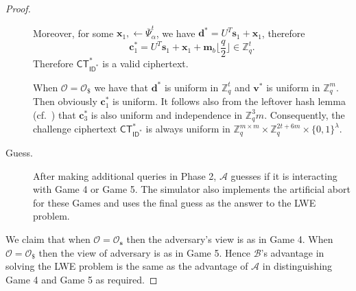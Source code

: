 \documentclass[runningheads,10pt]{llncs}
\def\ZZ{\mathbb{Z}}
\def\cal{\mathcal}
\def\bf{\mathbf}
\def\CT{\mathsf{CT}}
\def\Pr{\mathrm{Pr}}
\def\v{\bf{v}}
\def\d{\bf{d}}
\def\s{\bf{s}}
\def\c{\bf{c}}
\def\ID{\mathsf{ID}}
\def\W{\cal{W}}
\begin{document}
\begin{proof}
\begin{description}
		Moreover, for some $\bf{x}_1,\gets\overline{\Psi}_\alpha^t$, we have $\d^*=U^T\bf{s}_1+\bf{x}_1$, therefore
		$$\c_1^* = U^T\bf{s}_1 +\bf{x}_1 +\bf{m}_b\big\lfloor\frac{q}{2}\big\rfloor \in\ZZ_q^t.$$
		Therefore $\CT_{\ID^*}^*$ is a valid ciphertext.
		
		When $\cal{O}=\cal{O}_{\$}$ we have that $\bf{d}^*$ is uniform in $\ZZ_q^t$ and $\v^*$ is uniform in $\ZZ_q^m$. Then obviously $\c_1^*$ is uniform. It follows also from the leftover hash lemma (cf.~{\cite[Theorem 8.38]{Shoup}}) that $\c_3^*$ is also uniform and independence in $\ZZ_q^3m$. Consequently, the challenge ciphertext $\CT_{\ID^*}^*$ is always uniform in $\ZZ_q^{m \times m} \times \ZZ_q^{2t+6m} \times \{0,1\}^\lambda$.\\
		
		\item[Guess.] After making additional queries in Phase 2, $\cal{A}$ guesses if it is interacting with Game 4 or Game 5. The simulator also implements the artificial abort for these Games and uses the final guess as the answer to the LWE problem.
	\end{description}
	
	We claim that when $\cal{O}=\cal{O}_\s$ then the adversary's view is as in Game 4. When $\cal{O}=\cal{O}_\$$ then the view of adversary is as in Game 5. Hence $\cal{B}$'s advantage in solving the LWE problem is the same as the advantage of $\cal{A}$ in distinguishing Game 4 and Game 5 as required. 
	\fi
	
\end{proof}


\end{document}
